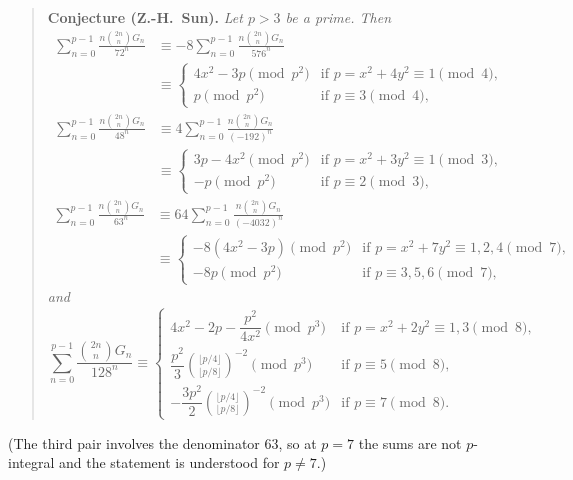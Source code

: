 \documentclass[11pt]{amsart}
\theoremstyle{definition}
\theoremstyle{remark}
\begin{document}
\begin{quote}\small
\textbf{Conjecture (Z.-H.~Sun).} \emph{Let $p>3$ be a prime. Then}
\[
\begin{aligned}
\sum_{n=0}^{p-1}\frac{n\binom{2n}{n}G_n}{72^n}
&\equiv-8\sum_{n=0}^{p-1}\frac{n\binom{2n}{n}G_n}{576^n}\\
&\equiv\begin{cases}
4x^2-3p\pmod{p^2}&\text{if }p=x^2+4y^2\equiv1\pmod4,\\
p\pmod{p^2}&\text{if }p\equiv3\pmod4,
\end{cases}
\end{aligned}
\]
\[
\begin{aligned}
\sum_{n=0}^{p-1}\frac{n\binom{2n}{n}G_n}{48^n}
&\equiv4\sum_{n=0}^{p-1}\frac{n\binom{2n}{n}G_n}{(-192)^n}\\
&\equiv\begin{cases}
3p-4x^2\pmod{p^2}&\text{if }p=x^2+3y^2\equiv1\pmod3,\\
-p\pmod{p^2}&\text{if }p\equiv2\pmod3,
\end{cases}
\end{aligned}
\]
\[
\begin{aligned}
\sum_{n=0}^{p-1}\frac{n\binom{2n}{n}G_n}{63^n}
&\equiv64\sum_{n=0}^{p-1}\frac{n\binom{2n}{n}G_n}{(-4032)^n}\\
&\equiv\begin{cases}
-8(4x^2-3p)\pmod{p^2}&\text{if }p=x^2+7y^2\equiv1,2,4\pmod7,\\
-8p\pmod{p^2}&\text{if }p\equiv3,5,6\pmod7,
\end{cases}
\end{aligned}
\]
\emph{and}
\[
\sum_{n=0}^{p-1}\frac{\binom{2n}{n}G_n}{128^n}\equiv
\begin{cases}
4x^2-2p-\dfrac{p^2}{4x^2}\pmod{p^3}&\text{if }p=x^2+2y^2\equiv1,3\pmod8,\\[2mm]
\dfrac{p^2}{3}\binom{\lfloor p/4\rfloor}{\lfloor p/8\rfloor}^{-2}\pmod{p^3}
&\text{if }p\equiv5\pmod8,\\[2mm]
-\dfrac{3p^2}{2}\binom{\lfloor p/4\rfloor}{\lfloor p/8\rfloor}^{-2}\pmod{p^3}
&\text{if }p\equiv7\pmod8.
\end{cases}
\]
\end{quote}

(The third pair involves the denominator $63$, so at $p=7$ the sums are
not $p$-integral and the statement is understood for $p\ne7$.)

\medskip
\end{document}
